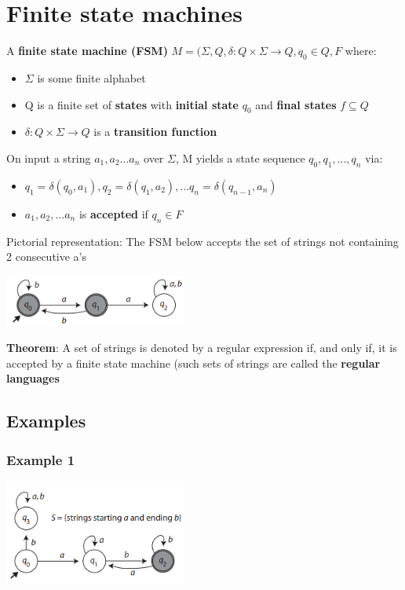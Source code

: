 \documentclass{article}[18pt]
\begin{document}
\section{Finite state machines}
A \textbf{finite state machine (FSM)} $M=(\Sigma,Q,\delta:Q\times \Sigma \rightarrow Q, q_0\in Q,F$ where:
\begin{itemize}
\item $\Sigma$ is some finite alphabet
\item Q is a finite set of \textbf{states} with \textbf{initial state} $q_0$ and \textbf{final states} $f\subseteq Q$
\item $\delta: Q\times\Sigma\rightarrow Q$ is a \textbf{transition function}
\end{itemize}
On input a string $a_1,a_2...a_n$ over $\Sigma$, M yields a state sequence $q_0,q_1,...,q_n$ via:
\begin{itemize}
\item $q_1=\delta(q_0,a_1),q_2=\delta(q_1,a_2),...q_n=\delta(q_{n-1},a_n)$
\item $a_1,a_2,...a_n$ is \textbf{accepted} if $q_n\in F$
\end{itemize}
Pictorial representation: The FSM below accepts the set of strings not containing 2 consecutive a's
\begin{center}
\includegraphics[width=6cm]{FSM1.png}
\end{center}
\textbf{Theorem}: A set of strings is denoted by a regular expression if, and only if, it is accepted by a finite state machine (such sets of strings are called the \textbf{regular languages}
\subsection{Examples}

\subsubsection{Example 1}
\begin{center}
\includegraphics[width=6cm]{FSM2.png}
\end{center}
\end{document}
